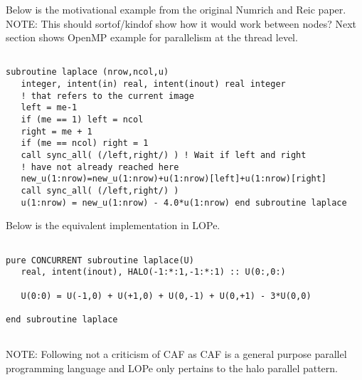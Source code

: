 Below is the motivational example from the original Numrich and Reic paper.
{NOTE: This should sortof/kindof show how it would work between nodes?  Next
section shows OpenMP example for parallelism at the thread level.}

{\small
\begin{verbatim}

subroutine laplace (nrow,ncol,u)
   integer, intent(in) real, intent(inout) real integer
   ! that refers to the current image
   left = me-1
   if (me == 1) left = ncol
   right = me + 1
   if (me == ncol) right = 1
   call sync_all( (/left,right/) ) ! Wait if left and right
   ! have not already reached here
   new_u(1:nrow)=new_u(1:nrow)+u(1:nrow)[left]+u(1:nrow)[right]
   call sync_all( (/left,right/) )
   u(1:nrow) = new_u(1:nrow) - 4.0*u(1:nrow) end subroutine laplace

\end{verbatim}
}


Below is the equivalent implementation in LOPe.


{\small
\begin{verbatim}

pure CONCURRENT subroutine laplace(U)
   real, intent(inout), HALO(-1:*:1,-1:*:1) :: U(0:,0:)

   U(0:0) = U(-1,0) + U(+1,0) + U(0,-1) + U(0,+1) - 3*U(0,0)

end subroutine laplace


\end{verbatim}
}

NOTE: Following not a criticism of CAF as CAF is a general purpose parallel
programming language and LOPe only pertains to the halo parallel pattern.

